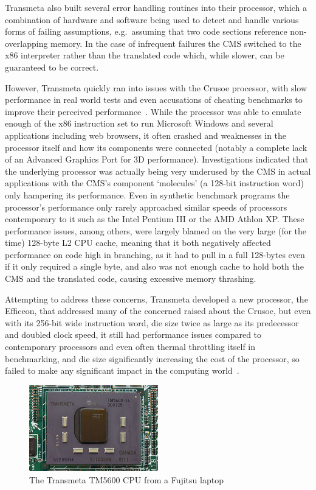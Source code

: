 Transmeta also built several error handling routines into their processor, which
a combination of hardware and software being used to detect and handle various
forms of failing assumptions, e.g.\ assuming that two code sections reference
non-overlapping memory. In the case of infrequent failures the CMS switched to
the x86 interpreter rather than the translated code which, while slower, can be
guaranteed to be correct.

However, Transmeta quickly ran into issues with the Crusoe processor, with slow
performance in real world tests and even accusations of cheating benchmarks to
improve their perceived performance~\cite{TrackingTransmetaCrusoe}. While the
processor was able to emulate enough of the x86 instruction set to run Microsoft
Windows and several applications including web browsers, it often crashed and
weaknesses in the processor itself and how its components were connected
(notably a complete lack of an Advanced Graphics Port for 3D performance).
Investigations indicated that the underlying processor was actually being very
underused by the CMS in actual applications with the CMS's component `molecules'
(a 128-bit instruction word) only hampering its performance. Even in synthetic
benchmark programs the processor's performance only rarely approached similar
speeds of processors contemporary to it such as the Intel Pentium III or the AMD
Athlon XP\@. These performance issues, among others, were largely blamed on the
very large (for the time) 128-byte L2 CPU cache, meaning that it both negatively
affected performance on code high in branching, as it had to pull in a full
128-bytes even if it only required a single byte, and also was not enough cache
to hold both the CMS and the translated code, causing excessive memory
thrashing.

Attempting to address these concerns, Transmeta developed a new processor, the
Efficeon, that addressed many of the concerned raised about the Crusoe, but even
with its 256-bit wide instruction word, die size twice as large as its
predecessor and doubled clock speed, it still had performance issues compared to
contemporary processors and even often thermal throttling itself in
benchmarking, and die size significantly increasing the cost of the processor,
so failed to make any significant impact in the computing
world~\cite{TrackingTransmetaEfficeon}.

\begin{figure}
  \includegraphics[width=0.5\textwidth]{imgs/Transmeta_TM5600}
  \caption{The Transmeta TM5600 CPU from a Fujitsu laptop}
\end{figure}

